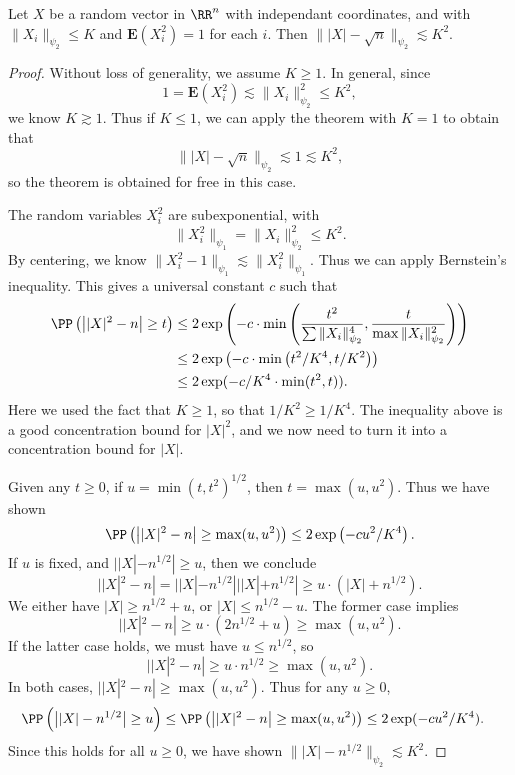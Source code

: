 \begin{theorem} \label{concentrationNorm}
    Let $X$ be a random vector in $\RR^n$ with independant coordinates, and with $\| X_i \|_{\psi_2} \leq K$ and $\mathbf{E}(X_i^2) = 1$ for each $i$. Then $\| |X| - \sqrt{n} \|_{\psi_2} \lesssim K^2$.
\end{theorem}
\begin{proof}
	Without loss of generality, we assume $K \geq 1$. In general, since
    \[ 1 = \mathbf{E}(X_i^2) \lesssim \| X_i \|_{\psi_2}^2 \leq K^2, \]
    we know $K \gtrsim 1$. Thus if $K \leq 1$, we can apply the theorem with $K = 1$ to obtain that
    \[ \| |X| - \sqrt{n} \|_{\psi_2} \lesssim 1 \lesssim K^2, \]
    so the theorem is obtained for free in this case.

    The random variables $X_i^2$ are subexponential, with
    \[ \| X_i^2 \|_{\psi_1} = \| X_i \|_{\psi_2}^2 \leq K^2. \]
    By centering, we know $\| X_i^2 - 1 \|_{\psi_1} \lesssim \| X_i^2 \|_{\psi_1}$. Thus we can apply Bernstein's inequality. This gives a universal constant $c$ such that
    \begin{align*}
        \PP \left( \big||X|^2 - n \big| \geq t \right) &\leq 2 \exp \left( -c \cdot \min \left( \frac{t^2}{\sum \| X_i \|_{\psi_2}^4}, \frac{t}{\max \| X_i \|_{\psi_2}^2} \right) \right)\\
        &\leq 2 \exp \left( -c \cdot \min \left( t^2 / K^4 , t/K^2 \right) \right)\\
        &\leq 2 \exp(- c/K^4 \cdot \min(t^2,t)).
    \end{align*}
    Here we used the fact that $K \geq 1$, so that $1/K^2 \geq 1/K^4$. The inequality above is a good concentration bound for $|X|^2$, and we now need to turn it into a concentration bound for $|X|$.

    Given any $t \geq 0$, if $u = \min(t,t^2)^{1/2}$, then $t = \max(u,u^2)$. Thus we have shown
    \[ \PP \left( \big||X|^2 - n \big| \geq \max(u,u^2) \right) \leq 2 \exp \left( - cu^2/K^4 \right). \]
    If $u$ is fixed, and $||X| - n^{1/2}| \geq u$, then we conclude
    \[ ||X|^2 - n| = ||X| - n^{1/2}|||X| + n^{1/2}| \geq u \cdot (|X| + n^{1/2}). \]
    We either have $|X| \geq n^{1/2} + u$, or $|X| \leq n^{1/2} - u$. The former case implies
    \[ ||X|^2 - n| \geq u \cdot (2n^{1/2} + u) \geq \max(u,u^2). \]
    If the latter case holds, we must have $u \leq n^{1/2}$, so
    \[ ||X|^2 - n| \geq u \cdot n^{1/2} \geq \max(u,u^2). \]
    In both cases, $||X|^2 - n| \geq \max(u,u^2)$. Thus for any $u \geq 0$,
    \begin{align*}
        \PP \left( \big| |X| - n^{1/2} \big| \geq u \right) &\leq \PP \left( \big| |X|^2 - n \big| \geq \max(u,u^2) \right) \leq 2 \exp(-cu^2/K^4).
    \end{align*}
    Since this holds for all $u \geq 0$, we have shown $\| |X| - n^{1/2} \|_{\psi_2} \lesssim K^2$.
\end{proof}

